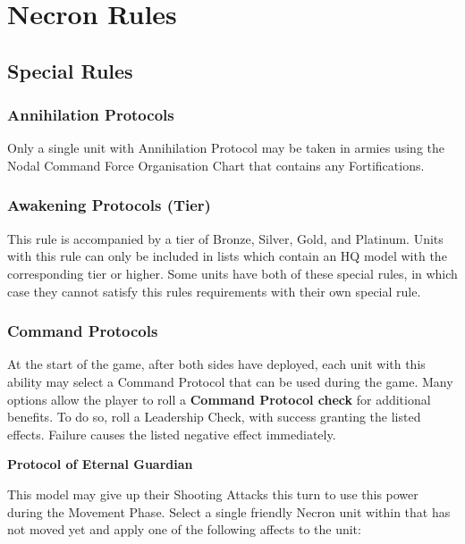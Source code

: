 \section{Necron Rules}

\subsection{Special Rules}

\begin{multicols}{2}

\subsubsection{Annihilation Protocols} \label{Annihilation Protocols}

Only a single unit with Annihilation Protocol may be taken in armies using the Nodal Command Force Organisation Chart that contains any Fortifications.

\subsubsection{Awakening Protocols (Tier)} \label{Awakening Protocols}

This rule is accompanied by a tier of Bronze, Silver, Gold, and Platinum. Units with this rule can only be included in lists which contain an HQ model with the corresponding  tier or higher. Some units have both of these special rules, in which case they cannot satisfy this rules requirements with their own  special rule.

\subsubsection{Command Protocols} \label{Command Protocols}

At the start of the game, after both sides have deployed, each unit with this ability may select a Command Protocol that can be used during the game. Many options allow the player to roll a \textbf{Command Protocol check} for additional benefits. To do so, roll a Leadership Check, with success granting the listed effects. Failure causes the listed negative effect immediately.

\textbf{Protocol of Eternal Guardian}

This model may give up their Shooting Attacks this turn to use this power during the Movement Phase. Select a single friendly Necron unit within  that has not moved yet and apply one of the following affects to the unit:


\end{multicols}
